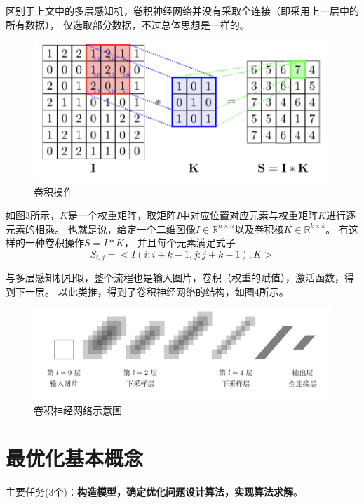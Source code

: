 \documentclass{article}
\begin{document}
区别于上文中的多层感知机，卷积神经网络并没有采取全连接（即采用上一层中的所有数据），
仅选取部分数据，不过总体思想是一样的。
\begin{figure}[h]
    \centering
    \includegraphics[scale=0.5]{3.png}
    \caption{卷积操作}
    \end{figure}
如图3所示，$K$是一个权重矩阵，取矩阵$I$中对应位置对应元素与权重矩阵$K$进行逐元素的相乘。
也就是说，给定一个二维图像$I \in \mathbb{R}^{n \times n}$以及卷积核$K \in \mathbb{R}^{k \times k}$。
有这样的一种卷积操作$S=I*K$，
并且每个元素满足式子$$ S_{i,j}=<I(i:i+k-1,j:j+k-1),K>$$

与多层感知机相似，整个流程也是输入图片，卷积（权重的赋值），激活函数，得到下一层。
以此类推，得到了卷积神经网络的结构，如图4所示。
\begin{figure}[h]
    \centering
    \includegraphics[scale=0.5]{4.png}
    \caption{卷积神经网络示意图}
    \end{figure}
\section{最优化基本概念}
主要任务(3个)：\textbf{构造模型，确定优化问题设计算法，实现算法求解}。
\end{document}
